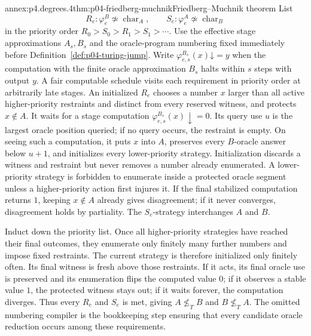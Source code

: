\begin{annexitem}{annex:p4.degrees.4}{thm:p04-friedberg-muchnik}{Friedberg--Muchnik theorem}
List
\[
 R_e:\varphi_e^B\not\simeq\operatorname{char}_A,
 \qquad S_e:\varphi_e^A\not\simeq\operatorname{char}_B
\]
in the priority order \(R_0>S_0>R_1>S_1>\cdots\).  Use the effective stage
approximations \(A_s,B_s\) and the oracle-program numbering fixed immediately
before Definition~\ref{def:p04-turing-jump}.  Write
\(\varphi_{e,s}^{B_s}(x)\mathord\downarrow=y\) when the computation with the
finite oracle approximation \(B_s\) halts within \(s\) steps with output
\(y\).  A fair computable schedule visits
each requirement in priority order at arbitrarily late stages.  An initialized
\(R_e\) chooses a number \(x\) larger than all active higher-priority
restraints and distinct from every reserved witness, and protects
\(x\notin A\).  It waits for a stage computation
\(\varphi_{e,s}^{B_s}(x)\downarrow=0\).  Its query use \(u\) is the largest
oracle position queried; if no query occurs, the restraint is empty.  On
seeing such a computation, it puts \(x\) into \(A\), preserves every
\(B\)-oracle answer below \(u+1\), and initializes every lower-priority strategy.
Initialization discards a witness and restraint but never removes a number
already enumerated.  A lower-priority strategy is forbidden to enumerate
inside a protected oracle segment unless a higher-priority action first
injures it.  If the final stabilized computation returns \(1\), keeping
\(x\notin A\) already gives disagreement; if it never converges, disagreement
holds by partiality.  The \(S_e\)-strategy interchanges \(A\) and \(B\).

\enlargethispage{5\baselineskip}
Induct down the priority list.  Once all higher-priority strategies have
reached their final outcomes, they enumerate only finitely many further
numbers and impose fixed restraints.  The current strategy is therefore
initialized only finitely often.  Its final witness is fresh above those
restraints.  If it acts, its final oracle use is preserved and its enumeration
flips the computed value \(0\); if it observes a stable value \(1\), the
protected witness stays out; if it waits forever, the computation diverges.
Thus every \(R_e\) and \(S_e\) is met, giving
\(A\not\leq_TB\) and \(B\not\leq_TA\).  The omitted numbering compiler is
the bookkeeping step ensuring that every candidate oracle reduction occurs
among these requirements.


\end{annexitem}
